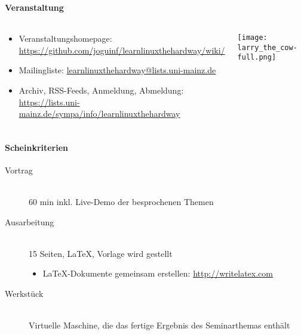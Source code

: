 \documentclass[utf8]{beamer}
\begin{document}
\begin{frame}
  \frametitle{\insertsectionhead}
  \framesubtitle{Veranstaltung}

  \begin{columns}
      \begin{block}{}
        \begin{itemize}
          \item Veranstaltungshomepage:
            \url{https://github.com/joguinf/learnlinuxthehardway/wiki/}
          \item Mailingliste: 
            \url{learnlinuxthehardway@lists.uni-mainz.de}
          \item Archiv, RSS-Feeds, Anmeldung, Abmeldung:
            \url{https://lists.uni-mainz.de/sympa/info/learnlinuxthehardway}
        \end{itemize}
      \end{block}
      \hfill
      \texttt{[image: larry\_the\_cow-full.png]}
  \end{columns}
\end{frame}

\begin{frame}
  \frametitle{\insertsectionhead}
  \framesubtitle{Scheinkriterien}

  \begin{block}{}
    \begin{description}
      \item[Vortrag] \hfill \\
        60 min inkl. Live-Demo der besprochenen Themen
      \item[Ausarbeitung] \hfill \\
        15 Seiten, \LaTeX{}, Vorlage wird gestellt
        \begin{itemize}
          \item \LaTeX{}-Dokumente gemeinsam erstellen:
            \url{http://writelatex.com}
        \end{itemize}
      \item[Werkstück] \hfill \\
        Virtuelle Maschine, die das fertige Ergebnis des Seminarthemas enthält
    \end{description}
  \end{block}
\end{frame}
\end{document}
